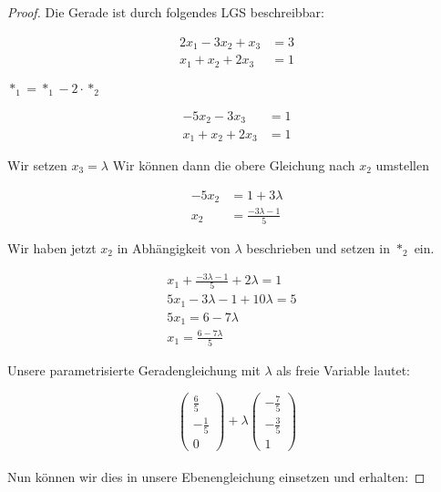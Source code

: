 \documentclass[12pt, letterpaper]{article}
\begin{document}
\begin{proof}

\noindent Die Gerade ist durch folgendes LGS beschreibbar:

\[
\begin{aligned}
    2x_1 - 3x_2 + x_3 &= 3 \\
    x_1 + x_2 + 2x_3 &= 1
\end{aligned}
\]

\noindent $\ast_1 = \ast_1 - 2\cdot \ast_2$\newline

\[
\begin{aligned}
    -5x_2 - 3x_3 &= 1 \\
    x_1 + x_2 + 2x_3 &= 1
\end{aligned}
\]

\noindent Wir setzen $x_3 = \lambda$\newline
\noindent Wir können dann die obere Gleichung nach $x_2$ umstellen

\[
\begin{aligned}
    -5x_2 &= 1+3\lambda\\ 
    x_2 &= \frac{-3\lambda-1}{5}
\end{aligned}
\]

\noindent Wir haben jetzt $x_2$ in Abhängigkeit von $\lambda$ beschrieben und setzen in $\ast_2$ ein.

\[
\begin{aligned}
    x_1 + \frac{-3\lambda-1}{5} + 2\lambda = 1&\\
    5x_1 - 3\lambda - 1 + 10\lambda = 5&\\
    5x_1 = 6 - 7\lambda&\\
    x_1 = \frac{6-7\lambda}{5}&
\end{aligned}
\]

\noindent Unsere parametrisierte Geradengleichung mit $\lambda$ als freie Variable lautet:

$$
\begin{pmatrix} \frac{6}{5} \\ -\frac{1}{5} \\ 0 \end{pmatrix} + \lambda \begin{pmatrix} -\frac{7}{5} \\ -\frac{3}{5} \\ 1 \end{pmatrix}
$$\\

\noindent Nun können wir dies in unsere Ebenengleichung einsetzen und erhalten:


\end{proof}
\end{document}
